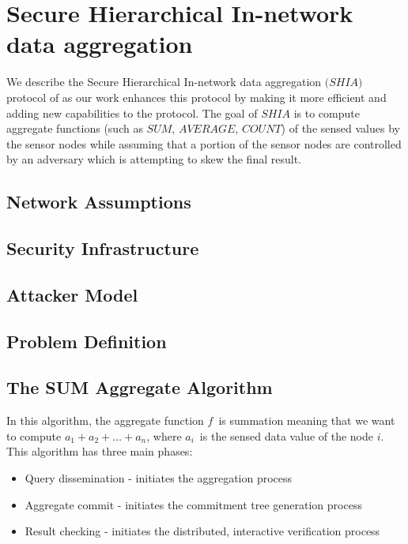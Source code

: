 \chapter{Secure Hierarchical In-network data aggregation} %
\label{cha:Secure Hierarchical In-network data aggregation}

We describe the Secure Hierarchical In-network data aggregation $\textit{(SHIA)}$ protocol of \cite{chan2006secure} as our work enhances this protocol by making it more efficient and adding new capabilities to the protocol. The goal of $\textit{SHIA}$ is to compute aggregate functions (such as $\textit{SUM}$, $\textit{AVERAGE}$, $\textit{COUNT}$) of the sensed values by the sensor nodes while assuming that a portion of the sensor nodes are controlled by an adversary which is attempting to skew the final result.

\section{Network Assumptions}
\section{Security Infrastructure}
\section{Attacker Model}
\section{Problem Definition}
\section{The SUM Aggregate Algorithm}
	In this algorithm, the aggregate function $f$\ is summation meaning that we want to compute $a_{1} + a_{2} + \dotsc + a_{n}$, where $a_{i}$\ is the sensed data value of the node $i$.
	This algorithm has three main phases:
	\begin{itemize}
		\item Query dissemination - initiates the aggregation process
		\item Aggregate commit - initiates the commitment tree generation process
		\item Result checking - initiates the distributed, interactive verification process
	\end{itemize}

